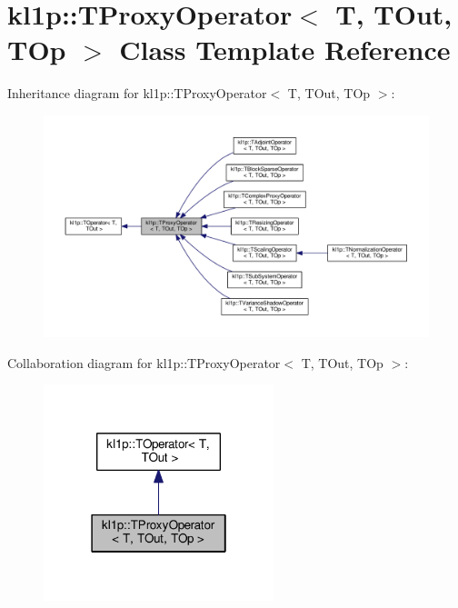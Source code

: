 \hypertarget{classkl1p_1_1TProxyOperator}{}\section{kl1p\+:\+:T\+Proxy\+Operator$<$ T, T\+Out, T\+Op $>$ Class Template Reference}
\label{classkl1p_1_1TProxyOperator}


Inheritance diagram for kl1p\+:\+:T\+Proxy\+Operator$<$ T, T\+Out, T\+Op $>$\+:
\nopagebreak
\begin{figure}[H]
\begin{center}
\leavevmode
\includegraphics[width=350pt]{classkl1p_1_1TProxyOperator__inherit__graph}
\end{center}
\end{figure}


Collaboration diagram for kl1p\+:\+:T\+Proxy\+Operator$<$ T, T\+Out, T\+Op $>$\+:
\nopagebreak
\begin{figure}[H]
\begin{center}
\leavevmode
\includegraphics[width=190pt]{classkl1p_1_1TProxyOperator__coll__graph}
\end{center}
\end{figure}
